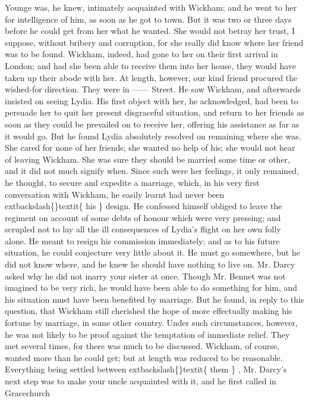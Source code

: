 \documentclass[10pt]{book}
\begin{document}
Younge was, he knew, intimately acquainted with Wickham; and he
went to her for intelligence of him, as soon as he got to town. But
it was two or three days before he could get from her what he
wanted. She would not betray her trust, I suppose, without bribery
and corruption, for she really did know where her friend was to be
found. Wickham, indeed, had gone to her on their first arrival in
London; and had she been able to receive them into her house, they
would have taken up their abode with her. At length, however, our
kind friend procured the wished-for direction. They were in ——
Street. He saw Wickham, and afterwards insisted on seeing Lydia.
His first object with her, he acknowledged, had been to persuade
her to quit her present disgraceful situation, and return to her
friends as soon as they could be prevailed on to receive her,
offering his assistance as far as it would go. But he found Lydia
absolutely resolved on remaining where she was. She cared for none
of her friends; she wanted no help of his; she would not hear of
leaving Wickham.
    She was sure they should be married some time or
other, and it did not much signify when. Since such were her
feelings, it only remained, he thought, to secure and expedite a
marriage, which, in his very first conversation with Wickham, he
easily learnt had never been
    	extbackslash\{\}textit\{
     his
    \}
    design. He confessed himself
obliged to leave the regiment on account of some debts of honour
which were very pressing; and scrupled not to lay all the ill
consequences of Lydia’s flight on her own folly alone. He meant to
resign his commission immediately; and as to his future situation,
he could conjecture very little about it. He must go somewhere, but
he did not know where, and he knew he should have nothing to live
on. Mr. Darcy asked why he did not marry your sister at once.
Though Mr. Bennet was not imagined to be very rich, he would have
been able to do something for him, and his situation must have been
benefited by marriage. But he found, in reply to this question,
that Wickham still cherished the hope of more effectually making
his fortune by marriage, in some other country. Under such
circumstances, however, he was not likely to be proof against the
temptation of immediate relief. They met several times, for there
was much to be discussed. Wickham, of course, wanted more than he
could get; but at length was reduced to be reasonable. Everything
being settled between
    	extbackslash\{\}textit\{
     them
    \}
    , Mr. Darcy’s next step was to make
your uncle acquainted with it, and he first called in Gracechurch
\end{document}
